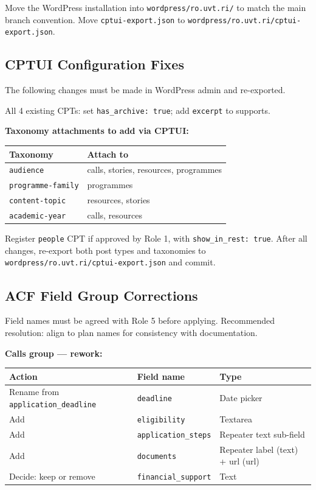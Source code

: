 \documentclass[12pt,a4paper]{article}
\begin{document}
Move the WordPress installation into \texttt{wordpress/ro.uvt.ri/} to match the main branch
convention. Move \texttt{cptui-export.json} to \texttt{wordpress/ro.uvt.ri/cptui-export.json}.

\subsection{CPTUI Configuration Fixes}

The following changes must be made in WordPress admin and re-exported.

All 4 existing CPTs: set \texttt{has\_archive: true}; add \texttt{excerpt} to supports.

\vspace{0.8em}
\noindent\textbf{Taxonomy attachments to add via CPTUI:}

\vspace{0.4em}
\begin{tabular}{@{}p{4cm}p{8.3cm}@{}}
\toprule
\rowcolor{uvtLightBlue}
\textbf{Taxonomy} & \textbf{Attach to} \\
\midrule
\texttt{audience} & calls, stories, resources, programmes \\
\texttt{programme-family} & programmes \\
\texttt{content-topic} & resources, stories \\
\texttt{academic-year} & calls, resources \\
\bottomrule
\end{tabular}

\vspace{0.8em}
Register \texttt{people} CPT if approved by Role 1, with \texttt{show\_in\_rest: true}.
After all changes, re-export both post types and taxonomies to
\texttt{wordpress/ro.uvt.ri/cptui-export.json} and commit.

\subsection{ACF Field Group Corrections}

Field names must be agreed with Role 5 before applying. Recommended resolution: align to
plan names for consistency with documentation.

\vspace{0.8em}
\noindent\textbf{Calls group --- rework:}

\vspace{0.4em}
\begin{tabular}{@{}p{3.5cm}p{3.5cm}p{5.3cm}@{}}
\toprule
\rowcolor{uvtLightBlue}
\textbf{Action} & \textbf{Field name} & \textbf{Type} \\
\midrule
Rename from \texttt{application\_deadline} & \texttt{deadline} & Date picker \\
Add & \texttt{eligibility} & Textarea \\
Add & \texttt{application\_steps} & Repeater \textrightarrow{} text sub-field \\
Add & \texttt{documents} & Repeater \textrightarrow{} label (text) + url (url) \\
Decide: keep or remove & \texttt{financial\_support} & Text \\
\bottomrule
\end{tabular}
\end{document}

